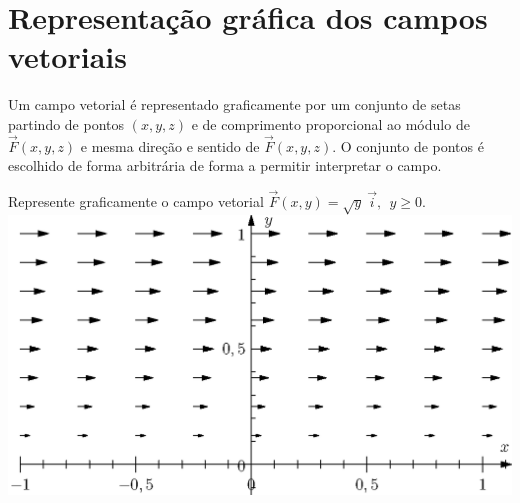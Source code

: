 \section{Representação gráfica dos campos vetoriais}
Um campo vetorial é representado graficamente por um conjunto de setas partindo de pontos $(x,y,z)$ e de comprimento proporcional ao módulo de $\vec{F}(x,y,z)$ e mesma direção e sentido de $\vec{F}(x,y,z)$. O conjunto de pontos é escolhido de forma arbitrária de forma a permitir interpretar o campo.

\begin{ex} Represente graficamente o campo vetorial $\vec{F}(x,y)=\sqrt{y}\ \!\vec{i},~~y\geq 0$.
\includegraphics{cap_campos/figs/campo_exemplo_1}
\end{ex}


